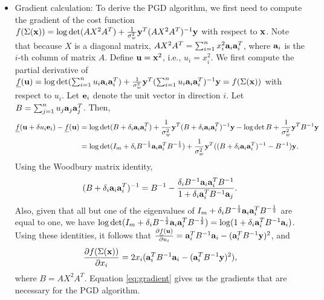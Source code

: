 \documentclass[onecolumn]{IEEEtran}
\newcommand{\av}{{\bf a}}
\begin{document}
\begin{itemize} 

\item Gradient calculation: To derive the PGD algorithm, we first need to compute the
gradient of the cost function $f(\Sigma({\bf x}))= \log\det (AX^2A^T) +{1\over \sigma_w^2}
{\bf y}^T (AX^2A^T)^{-1}{\bf y}$ with respect to ${\bf x}$. Note that because $X$ is a diagonal  matrix, $AX^2A^T=\sum_{i=1}^nx_i^2
\av_i\av_i^T$, where $\av_i$ is the $i$-th column of matrix $A$.  Define
${\bf u}={\bf x}^2$, i.e., $u_i=x_i^2$. We first compute the partial derivative of
$\underline{f}(\uv)=\log\det (\sum_{i=1}^nu_i \av_i\av_i^T)+{1\over \sigma_w^2} \yv^T (\sum_{i=1}^nu_i \av_i\av_i^T)^{-1}\yv = f(\Sigma(\xv))$ with respect to $u_i$.
Let ${\bf e}_i$ denote the unit vector in direction $i$.
Let $B = \sum_{j=1}^nu_j \av_j\av_j^T$.
Then,
\begin{align}
\underline{f}(\uv+\delta u_i \ev_i)-\underline{f}(\uv)&=\log\det (B +\delta_i \av_i\av_i^T )+{1\over \sigma_w^2} \yv^T (B +\delta_i \av_i\av_i^T )^{-1}\yv -\log\det B +{1\over \sigma_w^2} \yv^T B^{-1}\yv \nonumber\\
&=\log\det (I_m +\delta_i B^{-{1\over 2}} \av_i\av_i^TB^{-{1\over 2}} )+{1\over \sigma_w^2} \yv^T ((B +\delta_i \av_i\av_i^T )^{-1}-B^{-1})\yv.
\end{align}
Using the Woodbury matrix identity,
\[
(B +\delta_i \av_i\av_i^T )^{-1}=B^{-1}- {\delta_i B^{-1}\av_i\av_i^TB^{-1} \over 1 +\delta_i\av_i^T B^{-1}\av_j}.
\]
Also, given that all but one of the eigenvalues of  $I_m +\delta_i B^{-{1\over 2}} \av_i\av_i^TB^{-{1\over 2}} $ are equal to one, we have $\log\det (I_m +\delta_i B^{-{1\over 2}} \av_i\av_i^TB^{-{1\over 2}} )=\log(1+\delta_i \av_i^TB^{-1}\av_i)$. Using these identities, it follows that ${\partial \underline{f}(\uv) \over \partial u_i}= \av_i^TB^{-1}\av_i-(\av_i^TB^{-1} \yv)^2$, and 
\begin{equation}\label{eq:gradient}
{\partial f (\Sigma(\xv)) \over \partial x_i}= 2x_i(\av_i^TB^{-1}\av_i-(\av_i^TB^{-1} \yv)^2),
\end{equation}
where $B=AX^2A^T$. Equation \eqref{eq:gradient} gives us the gradients that are necessary for the PGD algorithm. 
 

\end{itemize}
\end{document}
